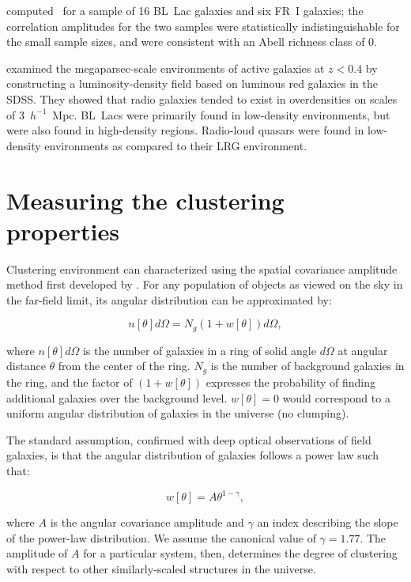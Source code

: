 \documentclass[useAMS,usenatbib]{mn2e}
\begin{document}
\citet{smi95} computed \bgb~for a sample of 16 BL~Lac galaxies and six FR~I galaxies; the correlation amplitudes for the two samples were statistically indistinguishable for the small sample sizes, and were consistent with an Abell richness class of 0. 

\citet{lie11} examined the megaparsec-scale environments of active galaxies at $z<0.4$ by constructing a luminosity-density field based on luminous red galaxies in the SDSS. They showed that radio galaxies tended to exist in overdensities on scales of 3~$h^{-1}$~Mpc. BL~Lacs were primarily found in low-density environments, but were also found in high-density regions. Radio-loud quasars were found in low-density environments as compared to their LRG environment. 


\section{Measuring the clustering properties}\label{sec-data}

Clustering environment can characterized using the spatial covariance amplitude method first developed by \citep{lon79}. For any population of objects as viewed on the sky in the far-field limit, its angular distribution can be approximated by:

\begin{equation}
\label{eqn-angcov}
n[\theta]d\Omega = N_g (1 + w[\theta]) d\Omega,
\end{equation}

\noindent where $n[\theta]d\Omega$ is the number of galaxies in a ring of solid angle $d\Omega$ at angular distance $\theta$ from the center of the ring. $N_g$ is the number of background galaxies in the ring, and the factor of $(1+w[\theta])$ expresses the probability of finding additional galaxies over the background level. $w[\theta]=0$ would correspond to a uniform angular distribution of galaxies in the universe (no clumping). 

The standard assumption, confirmed with deep optical observations of field galaxies, is that the angular distribution of galaxies follows a power law such that:

\begin{equation}
\label{eqn-wtheta}
w[\theta] = A\theta^{1-\gamma},
\end{equation}

\noindent where $A$ is the angular covariance amplitude and $\gamma$ an index describing the slope of the power-law distribution. We assume the canonical value of $\gamma=1.77$. The amplitude of $A$ for a particular system, then, determines the degree of clustering with respect to other similarly-scaled structures in the universe. 
\end{document}
